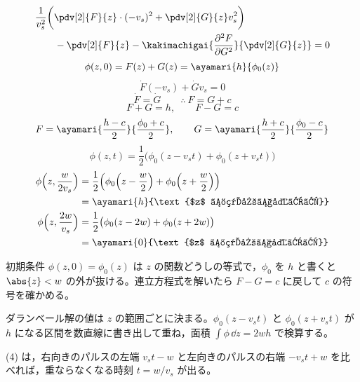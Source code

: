 \begin{align*}
  &\frac{1}{v_s^{2}}\biggl(\pdv[2]{F}{z}\cdot(-v_s)^{2}+\pdv[2]{G}{z}v_s^{2}\biggr)\\
  &\qquad-\pdv[2]{F}{z}-\kakimachigai{\frac{\partial^{2}F}{\partial G^{2}}}{\pdv[2]{G}{z}}=0
\end{align*}
\[ \phi(z,0)=F(z)+G(z)=\ayamari{h}{\phi_0(z)} \]
\[ \dot{F}(-v_s)+\dot{G}v_s=0 \]
\[ \dot{F}=\dot{G}\qquad\therefore\ F=G+c \]
\[ F+G=h,\qquad F-G=c \]
\[ F=\ayamari{\frac{h-c}{2}}{\frac{\phi_0+c}{2}},\qquad G=\ayamari{\frac{h+c}{2}}{\frac{\phi_0-c}{2}} \]
\[ \phi(z,t)=\frac{1}{2}\bigl(\phi_0(z-v_st)+\phi_0(z+v_st)\bigr) \]
\begin{align*}
  \phi\Bigl(z,\frac{w}{2v_s}\Bigr)&=\frac{1}{2}\Bigl(\phi_0\Bigl(z-\frac{w}{2}\Bigr)+\phi_0\Bigl(z+\frac{w}{2}\Bigr)\Bigr)\\
  &=\ayamari{h}{\text{$z$ の範囲で変わる}}\\
  \phi\Bigl(z,\frac{2w}{v_s}\Bigr)&=\frac{1}{2}\bigl(\phi_0(z-2w)+\phi_0(z+2w)\bigr)\\
  &=\ayamari{0}{\text{$z$ の範囲で変わる}}
\end{align*}
\mikai
\item 初期条件 $\phi(z,0)=\phi_0(z)$ は $z$ の関数どうしの等式で，$\phi_0$ を $h$ と書くと $\abs{z}<w$ の外が抜ける。連立方程式を解いたら $F-G=c$ に戻して $c$ の符号を確かめる。
\item ダランベール解の値は $z$ の範囲ごとに決まる。$\phi_0(z-v_st)$ と $\phi_0(z+v_st)$ が $h$ になる区間を数直線に書き出して重ね，面積 $\int\phi\,\dd z=2wh$ で検算する。
\item (4) は，右向きのパルスの左端 $v_st-w$ と左向きのパルスの右端 $-v_st+w$ を比べれば，重ならなくなる時刻 $t=w/v_s$ が出る。

